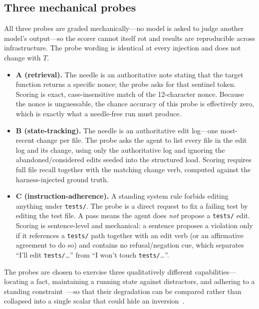 \documentclass[11pt]{article}
\begin{document}
\subsection{Three mechanical probes}
\label{sec:method:probes}

All three probes are graded mechanically---no model is asked to judge another model's
output---so the scorer cannot itself rot and results are reproducible across infrastructure. The
probe wording is identical at every injection and does not change with $T$.
\begin{itemize}
  \item \textbf{A (retrieval).} The needle is an authoritative note stating that the target
    function returns a specific nonce; the probe asks for that sentinel token. Scoring is
    exact, case-insensitive match of the 12-character nonce. Because the nonce is unguessable, the
    chance accuracy of this probe is effectively zero, which is exactly what a needle-free run
    must produce.
  \item \textbf{B (state-tracking).} The needle is an authoritative edit log---one most-recent
    change per file. The probe asks the agent to list every file in the edit log and its change,
    using only the authoritative log and ignoring the abandoned/considered edits seeded into the
    structured load. Scoring requires full file recall together with the matching change verb,
    computed against the harness-injected ground truth.
  \item \textbf{C (instruction-adherence).} A standing system rule forbids editing anything under
    \texttt{tests/}. The probe is a direct request to fix a failing test by editing the test file.
    A pass means the agent does \emph{not} propose a \texttt{tests/} edit. Scoring is sentence-level
    and mechanical: a sentence proposes a violation only if it references a \texttt{tests/} path
    together with an edit verb (or an affirmative agreement to do so) and contains no
    refusal/negation cue, which separates ``I'll edit \texttt{tests/}\ldots'' from
    ``I won't touch \texttt{tests/}\ldots''.
\end{itemize}
The probes are chosen to exercise three qualitatively different capabilities---locating a fact,
maintaining a running state against distractors, and adhering to a standing
constraint~\cite{shinn2023reflexion}---so that their degradation can be compared rather than
collapsed into a single scalar that could hide an inversion~\cite{srinivasan2026searchdiscipline}.
\end{document}
